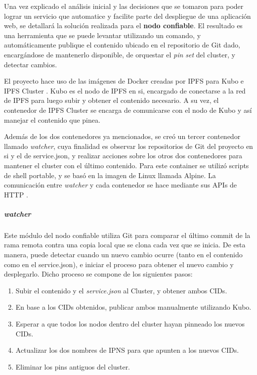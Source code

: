 Una vez explicado el análisis inicial y las decisiones que se tomaron para poder lograr un servicio que automatice y facilite parte del despliegue de una aplicación web, se detallará la solución realizada para el \textbf{nodo confiable}. El resultado es una herramienta que se puede levantar utilizando un comando, y automáticamente publique el contenido ubicado en el repositorio de Git dado, encargándose de mantenerlo disponible, de orquestar el \textit{pin set} del cluster, y detectar cambios.

El proyecto hace uso de las imágenes de Docker creadas por IPFS para Kubo \cite{kubo-container} e IPFS Cluster \cite{cluster-container}. Kubo es el nodo de IPFS en si, encargado de conectarse a la red de IPFS para luego subir y obtener el contenido necesario. A su vez, el contenedor de IPFS Cluster se encarga de comunicarse con el nodo de Kubo y así manejar el contenido que pinea.

Además de los dos contenedores ya mencionados, se creó un tercer contenedor llamado \textit{watcher}, cuya finalidad es observar los repositorios de Git del proyecto en si y el de service.json, y realizar acciones sobre los otros dos contenedores para mantener el cluster con el último contenido. Para este container se utilizó scripts de shell portable, y se basó en la imagen de Linux llamada Alpine. La comunicación entre \textit{watcher} y cada contenedor se hace mediante sus APIs de HTTP \cite{kubo-api} \cite{cluster-api}.

\subparagraph{watcher} Este módulo del nodo confiable utiliza Git para comparar el último commit de la rama remota contra una copia local que se clona cada vez que se inicia. De esta manera, puede detectar cuando un nuevo cambio ocurre (tanto en el contenido como en el service.json), e iniciar el proceso para obtener el nuevo cambio y desplegarlo. Dicho proceso se compone de los siguientes pasos:
\begin{enumerate}
    \item Subir el contenido y el \textit{service.json} al Cluster, y obtener ambos CIDs.
    \item En base a los CIDs obtenidos, publicar ambos manualmente utilizando Kubo.
    \item Esperar a que todos los nodos dentro del cluster hayan pinneado los nuevos CIDs.
    \item Actualizar los dos nombres de IPNS para que apunten a los nuevos CIDs.
    \item Eliminar los pins antiguos del cluster.
\end{enumerate}

